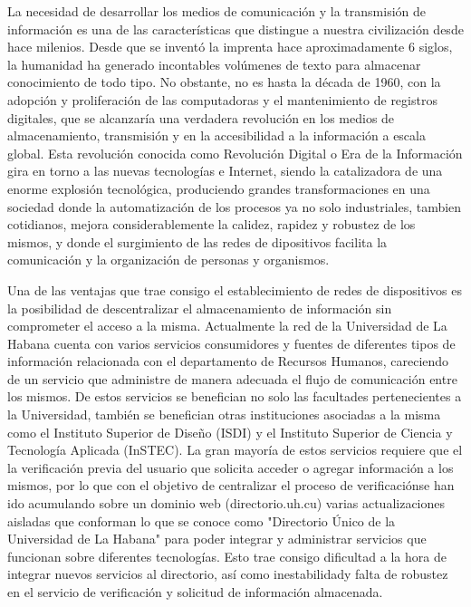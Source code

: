 \begin{introduction}
        La necesidad de desarrollar los medios de comunicación y la transmisión de información 
    es una de las características que distingue a nuestra civilización desde hace milenios. Desde 
    que se inventó la imprenta hace aproximadamente 6 siglos, la humanidad ha generado incontables 
    volúmenes de texto para almacenar conocimiento de todo tipo. No obstante, no es hasta la 
    década de 1960, con la adopción y proliferación de las computadoras y el mantenimiento de registros 
    digitales, que se alcanzaría una verdadera revolución en los medios de almacenamiento, transmisión 
    y en la accesibilidad a la información a escala global. Esta revolución conocida como Revolución 
    Digital o Era de la Información gira en torno a las nuevas tecnologías e Internet, siendo la 
    catalizadora de una enorme explosión tecnológica, produciendo grandes transformaciones en una 
    sociedad donde la automatización de los procesos ya no solo industriales, tambien cotidianos, 
    mejora considerablemente la calidez, rapidez y robustez de los mismos, y donde el surgimiento 
    de las redes de dipositivos facilita la comunicación y la organización de personas y organismos.
        
        Una de las ventajas que trae consigo el establecimiento de redes de dispositivos es la posibilidad 
    de descentralizar el almacenamiento de información sin comprometer el acceso a la misma. Actualmente 
    la red de la Universidad de La Habana cuenta con varios servicios consumidores y fuentes 
    de diferentes tipos de información relacionada con el departamento de Recursos Humanos, careciendo 
    de un servicio que administre de manera adecuada el flujo de comunicación entre los mismos. De estos servicios 
    se benefician no solo las facultades pertenecientes a la Universidad, también se benefician otras 
    instituciones asociadas a la misma como el Instituto Superior de Diseño (ISDI) y el Instituto Superior 
    de Ciencia y Tecnología Aplicada (InSTEC). La gran mayoría de estos servicios requiere que el la 
    verificación previa del usuario que solicita acceder o agregar información a los mismos, por lo que 
    con el objetivo de centralizar el proceso de verificaciónse han ido acumulando sobre un dominio web 
    (directorio.uh.cu) varias actualizaciones aisladas que conforman lo que se conoce como "Directorio 
    Único de la Universidad de La Habana" para poder integrar y administrar servicios que funcionan sobre 
    diferentes tecnologías. Esto trae consigo dificultad a la hora de integrar nuevos servicios al directorio, 
    así como inestabilidady falta de robustez en el servicio de verificación y solicitud de información almacenada.




\end{introduction}
